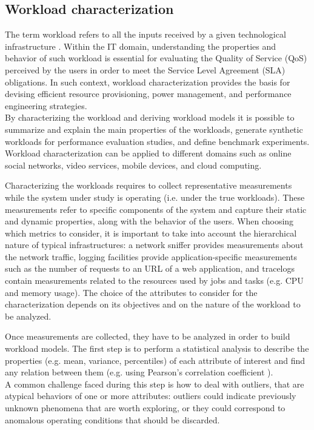\documentclass[a4paper, 12pt]{article} %
\begin{document}
	\subsection{Workload characterization} \label{ssec:workload_characterization}
	The term workload refers to all the inputs received by a given technological infrastructure \cite{WorkloadCharacterization}. Within the IT domain, understanding the properties and behavior of such workload is essential for evaluating the Quality of Service (QoS) perceived by the users in order to meet the Service Level Agreement (SLA) obligations. In such context, workload characterization provides the basis for devising efficient resource provisioning, power management, and performance engineering strategies.\\
	By characterizing the workload and deriving workload models it is possible to summarize and explain the main properties of the workloads, generate synthetic workloads for performance evaluation studies, and define benchmark experiments. Workload characterization can be applied to different domains such as online social networks, video services, mobile devices, and cloud computing.
	
	Characterizing the workloads requires to collect representative measurements while the system under study is operating (i.e. under the true workloads). These measurements refer to specific components of the system and capture their static and dynamic properties, along with the behavior of the users. When choosing which metrics to consider, it is important to take into account the hierarchical nature of typical infrastructures: a network sniffer provides measurements about the network traffic, logging facilities provide application-specific measurements such as the number of requests to an URL of a web application, and tracelogs contain measurements related to the resources used by jobs and tasks (e.g. CPU and memory usage). The choice of the attributes to consider for the characterization depends on its objectives and on the nature of the workload to be analyzed.
	
	Once measurements are collected, they have to be analyzed in order to build workload models. The first step is to perform a statistical analysis to describe the properties (e.g. mean, variance, percentiles) of each attribute of interest and find any relation between them (e.g. using Pearson's correlation coefficient \cite{PearsonCoefficient}). \\
	A common challenge faced during this step is how to deal with outliers, that are atypical behaviors of one or more attributes: outliers could indicate previously unknown phenomena that are worth exploring, or they could correspond to anomalous operating conditions that should be discarded.
	
\end{document}
